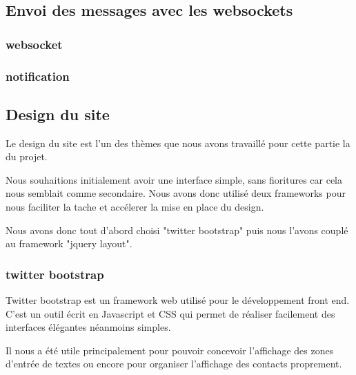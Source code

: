 \subsection{Envoi des messages avec les websockets}



\subsubsection{websocket}

\subsubsection{notification}



\subsection{Design du site}

Le design du site est l'un des thèmes que nous avons travaillé pour cette partie la du projet. 

Nous souhaitions initialement avoir une interface simple, sans fioritures car cela nous semblait comme
secondaire. Nous avons donc utilisé deux frameworks pour nous faciliter la tache et accélerer la mise
en place du design.

Nous avons donc tout d'abord choisi "twitter bootstrap" puis nous l'avons couplé au framework "jquery
layout".
\\


\subsubsection{twitter bootstrap}

Twitter bootstrap est un framework web utilisé pour le développement front end. C'est un outil écrit en
Javascript et CSS qui permet de réaliser facilement des interfaces élégantes néanmoins simples. 

Il nous a été utile principalement pour pouvoir concevoir l'affichage des zones d'entrée de textes ou 
encore pour organiser l'affichage des contacts proprement.
\\


